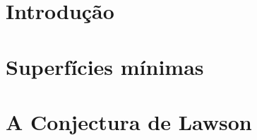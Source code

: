 \documentclass[mestrado, pos-defesa]{packages/icmc}
\begin{document}
\textual

\newcommand{\comando}[1]{\textbf{$\backslash$#1}}



\chapter{Introdução}
\label{chapter:introducao}


%

\chapter{Superfícies mínimas}
\label{chapter:superficies-minimas}


\chapter{A Conjectura de Lawson}
\label{chapter:a-conjectura-de-lawson}


%
%
%
%
%
%
%
%
%
%
%
%
\end{document}
